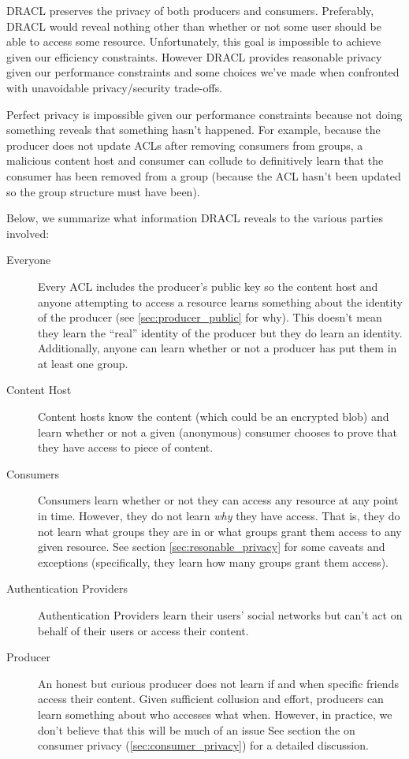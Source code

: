 \documentclass[pdftex,12pt,a4papaer,twoside,notitlepage]{report}
\begin{document}
DRACL preserves the privacy of both producers and consumers. Preferably, DRACL
would reveal nothing other than whether or not some user should be able to
access some resource. Unfortunately, this goal is impossible to achieve given
our efficiency constraints. However DRACL provides reasonable privacy given our
performance constraints and some choices we've made when confronted with
unavoidable privacy/security trade-offs.

Perfect privacy is impossible given our performance constraints because not
doing something reveals that something hasn't happened. For example, because the
producer does not update ACLs after removing consumers from groups, a malicious
content host and consumer can collude to definitively learn that the consumer
has been removed from a group (because the ACL hasn't been updated so the group
structure must have been).

Below, we summarize what information DRACL reveals to the various parties involved:

\begin{description}
\item[Everyone] Every ACL includes the producer's public key so the content host
  and anyone attempting to access a resource learns something about the identity
  of the producer (see \cref{sec:producer_public} for why). This doesn't mean
  they learn the ``real'' identity of the producer but they do learn an
  identity. Additionally, anyone can learn whether or not a producer has put
  them in at least one group.
\item[Content Host] Content hosts know the content (which could be an encrypted
  blob) and learn whether or not a given (anonymous) consumer chooses to prove
  that they have access to piece of content.
\item[Consumers] Consumers learn whether or not they can access any resource at
  any point in time. However, they do not learn \emph{why} they have access.
  That is, they do not learn what groups they are in or what groups grant them
  access to any given resource. See section \cref{sec:resonable_privacy} for
  some caveats and exceptions (specifically, they learn how many groups grant
  them access).
\item[Authentication Providers] Authentication Providers learn their users'
  social networks but can't act on behalf of their users or access their
  content.
\item[Producer] An honest but curious producer does not learn if and when
  specific friends access their content. Given sufficient collusion and effort,
  producers can learn something about who accesses what when. However, in
  practice, we don't believe that this will be much of an issue See section the
  on consumer privacy (\cref{sec:consumer_privacy}) for a detailed discussion.
\end{description}
\end{document}
